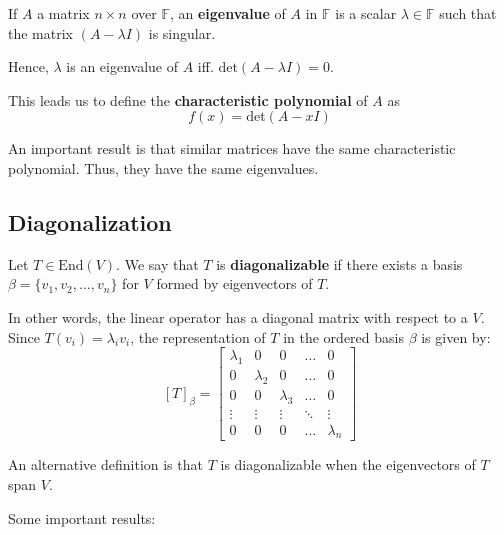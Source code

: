 \begin{definition}
	If $A$ a matrix $n \times n$ over $\mathbb{F}$, an \textbf{eigenvalue} of $A$ in $\mathbb{F}$ is a scalar $\lambda \in \mathbb{F}$ such that the matrix $(A - \lambda I)$ is singular.
\end{definition}

Hence, $\lambda$ is an eigenvalue of $A$ iff. $\text{det}(A-\lambda I) = 0$.

\begin{definition}
	This leads us to define the \textbf{characteristic polynomial} of $A$ as \[ f(x) = \text{det}(A-xI) \]
\end{definition}

An important result is that similar matrices have the same characteristic polynomial. Thus, they have the same eigenvalues.

\subsection{Diagonalization}

\begin{definition}[Diagonalization]
	Let $T \in \text{End}(V)$. We say that $T$ is \textbf{diagonalizable} if there exists a basis $\beta = \{ v_1, v_2, \ldots, v_n \}$ for $V$ formed by eigenvectors of $T$.
\end{definition}

In other words, the linear operator has a diagonal matrix with respect to a $V$. Since $T(v_i) = \lambda_i v_i$, the representation of $T$ in the ordered basis $\beta$ is given by:
\[
	[T]_{\beta} = \begin{bmatrix}
	\lambda_1 & 0 & 0 & \ldots & 0 \\
	0 & \lambda_2 & 0 & \ldots & 0 \\
	0 & 0 & \lambda_3 & \ldots & 0 \\
	\vdots & \vdots & \vdots & \ddots & \vdots \\
	0 & 0 & 0 & \ldots & \lambda_n
	\end{bmatrix}
\]

An alternative definition is that $T$ is diagonalizable when the eigenvectors of $T$ span $V$.

Some important results:

